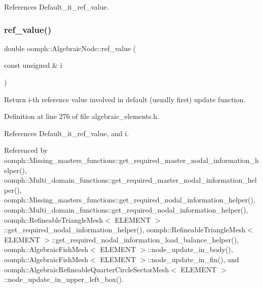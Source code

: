 References Default\+\_\+it\+\_\+ref\+\_\+value.

\mbox{\label{classoomph_1_1AlgebraicNode_a9658be0ccdb312e7cf0175663407f463}} 
\subsubsection{\texorpdfstring{ref\+\_\+value()}{ref\_value()}}
{\footnotesize\ttfamily double oomph\+::\+Algebraic\+Node\+::ref\+\_\+value (\begin{DoxyParamCaption}\item[{const unsigned \&}]{i }\end{DoxyParamCaption})\hspace{0.3cm}{\ttfamily [inline]}}



Return i-\/th reference value involved in default (usually first) update function. 



Definition at line 276 of file algebraic\+\_\+elements.\+h.



References Default\+\_\+it\+\_\+ref\+\_\+value, and i.



Referenced by oomph\+::\+Missing\+\_\+masters\+\_\+functions\+::get\+\_\+required\+\_\+master\+\_\+nodal\+\_\+information\+\_\+helper(), oomph\+::\+Multi\+\_\+domain\+\_\+functions\+::get\+\_\+required\+\_\+master\+\_\+nodal\+\_\+information\+\_\+helper(), oomph\+::\+Missing\+\_\+masters\+\_\+functions\+::get\+\_\+required\+\_\+nodal\+\_\+information\+\_\+helper(), oomph\+::\+Multi\+\_\+domain\+\_\+functions\+::get\+\_\+required\+\_\+nodal\+\_\+information\+\_\+helper(), oomph\+::\+Refineable\+Triangle\+Mesh$<$ E\+L\+E\+M\+E\+N\+T $>$\+::get\+\_\+required\+\_\+nodal\+\_\+information\+\_\+helper(), oomph\+::\+Refineable\+Triangle\+Mesh$<$ E\+L\+E\+M\+E\+N\+T $>$\+::get\+\_\+required\+\_\+nodal\+\_\+information\+\_\+load\+\_\+balance\+\_\+helper(), oomph\+::\+Algebraic\+Fish\+Mesh$<$ E\+L\+E\+M\+E\+N\+T $>$\+::node\+\_\+update\+\_\+in\+\_\+body(), oomph\+::\+Algebraic\+Fish\+Mesh$<$ E\+L\+E\+M\+E\+N\+T $>$\+::node\+\_\+update\+\_\+in\+\_\+fin(), and oomph\+::\+Algebraic\+Refineable\+Quarter\+Circle\+Sector\+Mesh$<$ E\+L\+E\+M\+E\+N\+T $>$\+::node\+\_\+update\+\_\+in\+\_\+upper\+\_\+left\+\_\+box().

